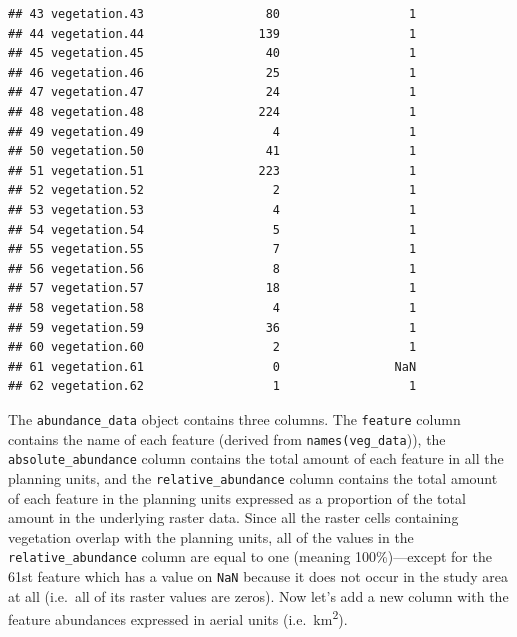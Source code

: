 \documentclass[12pt,]{book}
\newenvironment{Shaded}{\begin{snugshade}}{\end{snugshade}}
\newcommand{\KeywordTok}[1]{\textcolor[rgb]{0.13,0.29,0.53}{\textbf{#1}}}
\newcommand{\DecValTok}[1]{\textcolor[rgb]{0.00,0.00,0.81}{#1}}
\newcommand{\StringTok}[1]{\textcolor[rgb]{0.31,0.60,0.02}{#1}}
\newcommand{\CommentTok}[1]{\textcolor[rgb]{0.56,0.35,0.01}{\textit{#1}}}
\newcommand{\OperatorTok}[1]{\textcolor[rgb]{0.81,0.36,0.00}{\textbf{#1}}}
\newcommand{\NormalTok}[1]{#1}
\begin{document}
\begin{verbatim}
## 43 vegetation.43                 80                  1
## 44 vegetation.44                139                  1
## 45 vegetation.45                 40                  1
## 46 vegetation.46                 25                  1
## 47 vegetation.47                 24                  1
## 48 vegetation.48                224                  1
## 49 vegetation.49                  4                  1
## 50 vegetation.50                 41                  1
## 51 vegetation.51                223                  1
## 52 vegetation.52                  2                  1
## 53 vegetation.53                  4                  1
## 54 vegetation.54                  5                  1
## 55 vegetation.55                  7                  1
## 56 vegetation.56                  8                  1
## 57 vegetation.57                 18                  1
## 58 vegetation.58                  4                  1
## 59 vegetation.59                 36                  1
## 60 vegetation.60                  2                  1
## 61 vegetation.61                  0                NaN
## 62 vegetation.62                  1                  1
\end{verbatim}

The \texttt{abundance\_data} object contains three columns. The
\texttt{feature} column contains the name of each feature (derived from
\texttt{names(veg\_data})), the \texttt{absolute\_abundance} column
contains the total amount of each feature in all the planning units, and
the \texttt{relative\_abundance} column contains the total amount of
each feature in the planning units expressed as a proportion of the
total amount in the underlying raster data. Since all the raster cells
containing vegetation overlap with the planning units, all of the values
in the \texttt{relative\_abundance} column are equal to one (meaning
100\%)---except for the 61st feature which has a value on \texttt{NaN}
because it does not occur in the study area at all (i.e.~all of its
raster values are zeros). Now let's add a new column with the feature
abundances expressed in aerial units (i.e.~km\textsuperscript{2}).

\begin{Shaded}
\end{Shaded}
\end{document}
